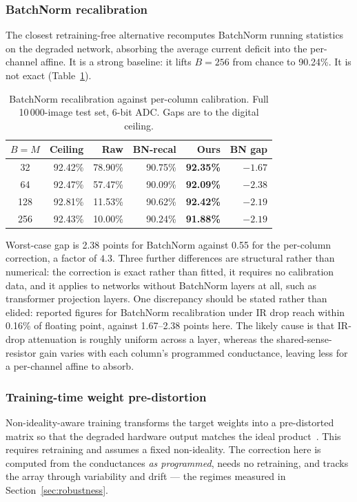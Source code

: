 \documentclass[conference]{IEEEtran}
\begin{document}
\subsubsection{BatchNorm recalibration}
The closest retraining-free alternative recomputes BatchNorm running statistics on the degraded network, absorbing the average current deficit into the per-channel affine. It is a strong baseline: it lifts $B{=}256$ from chance to 90.24\%. It is not exact (Table~\ref{tab:bn}).

\begin{table}[H]
    \centering
    \caption{BatchNorm recalibration against per-column calibration. Full 10\,000-image test set, 6-bit ADC. Gaps are to the digital ceiling.}
    \label{tab:bn}
    \begin{tabular}{crrrrr}
        \toprule
        $B{=}M$ & \textbf{Ceiling} & \textbf{Raw} & \textbf{BN-recal} & \textbf{Ours} & \textbf{BN gap} \\
        \midrule
        32  & 92.42\% & 78.90\% & 90.75\% & \textbf{92.35\%} & $-1.67$ \\
        64  & 92.47\% & 57.47\% & 90.09\% & \textbf{92.09\%} & $-2.38$ \\
        128 & 92.81\% & 11.53\% & 90.62\% & \textbf{92.42\%} & $-2.19$ \\
        256 & 92.43\% & 10.00\% & 90.24\% & \textbf{91.88\%} & $-2.19$ \\
        \bottomrule
    \end{tabular}
\end{table}

Worst-case gap is 2.38 points for BatchNorm against 0.55 for the per-column correction, a factor of $4.3$. Three further differences are structural rather than numerical: the correction is exact rather than fitted, it requires no calibration data, and it applies to networks without BatchNorm layers at all, such as transformer projection layers. One discrepancy should be stated rather than elided: reported figures for BatchNorm recalibration under IR drop reach within 0.16\% of floating point, against 1.67--2.38 points here. The likely cause is that IR-drop attenuation is roughly uniform across a layer, whereas the shared-sense-resistor gain varies with each column's programmed conductance, leaving less for a per-channel affine to absorb.

\subsubsection{Training-time weight pre-distortion}
Non-ideality-aware training transforms the target weights into a pre-distorted matrix so that the degraded hardware output matches the ideal product~\cite{joshi2020}. This requires retraining and assumes a fixed non-ideality. The correction here is computed from the conductances \emph{as programmed}, needs no retraining, and tracks the array through variability and drift --- the regimes measured in Section~\ref{sec:robustness}.
\end{document}
